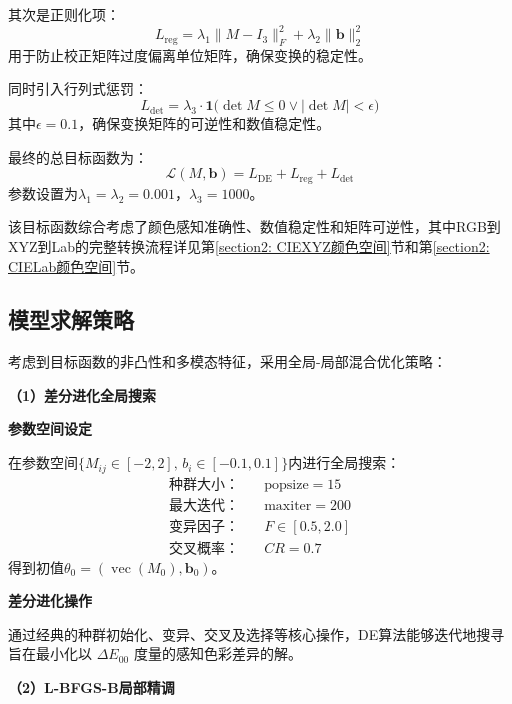 其次是正则化项：
\begin{equation}
L_{\mathrm{reg}}=\lambda_1\|M-I_3\|_F^2+\lambda_2\|\mathbf{b}\|_2^2
\end{equation}
用于防止校正矩阵过度偏离单位矩阵，确保变换的稳定性。

同时引入行列式惩罚：
\begin{equation}
L_{\det}=\lambda_3 \cdot \mathbf{1}\bigl(\det M\leq0 \lor |\det M|<\epsilon\bigr)
\end{equation}
其中$\epsilon=0.1$，确保变换矩阵的可逆性和数值稳定性。

最终的总目标函数为：
\begin{equation}
\mathcal{L}(M,\mathbf{b})=L_{\mathrm{DE}}+L_{\mathrm{reg}}+L_{\det}
\end{equation}
参数设置为$\lambda_1=\lambda_2=0.001$，$\lambda_3=1000$。

该目标函数综合考虑了颜色感知准确性、数值稳定性和矩阵可逆性，其中RGB到XYZ到Lab的完整转换流程详见第\ref{section2: CIEXYZ颜色空间}节和第\ref{section2: CIELab颜色空间}节。

\subsection[\hspace{-2pt}模型求解策略]{{\heiti{}\hspace{-8pt}模型求解策略}}\label{subsec:3-solver}

考虑到目标函数的非凸性和多模态特征，采用全局-局部混合优化策略：

\noindent\textbf{（1）差分进化全局搜索}

 \textbf{参数空间设定}

在参数空间$\{M_{ij}\in[-2,2],\,b_i\in[-0.1,0.1]\}$内进行全局搜索：
\begin{align}
  \text{种群大小：} &\quad \text{popsize} = 15\\
  \text{最大迭代：} &\quad \text{maxiter} = 200\\
  \text{变异因子：} &\quad F \in [0.5, 2.0]\\
  \text{交叉概率：} &\quad CR = 0.7
\end{align}
得到初值$\theta_0=(\operatorname{vec}(M_0),\mathbf{b}_0)$。

 \textbf{差分进化操作}

通过经典的种群初始化、变异、交叉及选择等核心操作，DE算法能够迭代地搜寻旨在最小化以 $\Delta E_{00}$ 度量的感知色彩差异的解。

\noindent\textbf{（2）L-BFGS-B局部精调}

